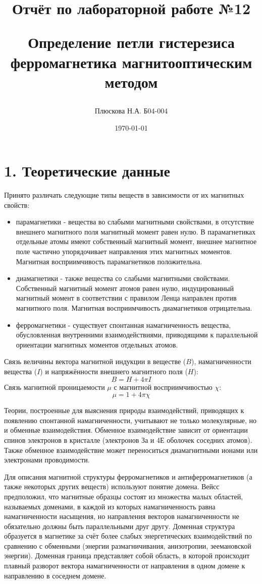 \documentclass[a4paper,12pt]{report}
\title{Отчёт по лабораторной работе №12

Определение петли гистерезиса
ферромагнетика магнитооптическим методом}
\author{Плюскова Н.А. Б04-004 }
\date{\today}
\begin{document}
\maketitle


\section*{1. Теоретические данные}
 Принято различать следующие типы веществ в зависимости от их магнитных свойств:
\begin{itemize}
    \item парамагнетики - вещества во слабыми магнитными свойствами, в отсутствие внешнего магнитного поля магнитный момент равен нулю. В парамагнетиках отдельные атомы имеют собственный магнитный момент, внешнее магнитное поле частично упорядочивает направления этих магнитных моментов. Магнитная восприимчивость парамагнетиков положительна.
    \item диамагнетики - также вещества со слабыми магнитными свойствами. Собственный магнитный момент атомов равен нулю, индуцированный магнитный момент в соответствии с правилом Ленца направлен против магнитного поля. Магнитная восприимчивость диамагнетиков отрицательна.
    \item ферромагнетики - существует спонтанная намагниченность вещества, обусловленная внутренними взаимодействиями, приводящими к параллельной ориентации магнитных моментов отдельных атомов.
\end{itemize}

Связь величины вектора магнитной индукции в веществе ($B$), намагниченности вещества ($I$) и напряжённости внешнего магнитного поля ($H$):
\begin{equation}
    B = H + 4\pi I
\end{equation}
Связь магнитной проницаемости $\mu$ с магнитной восприимчивостью $\chi$:
\begin{equation}
    \mu = 1 + 4\pi \chi
\end{equation}

Теории, построенные для выяснения природы взаимодействий, приводящих к появлению спонтанной намагниченности, учитывают не только молекулярные, но и обменные взаимодействия. Обменное взаимодействие зависит от ориентации спинов электронов в кристалле (электронов За и 4Е оболочек соседних атомов). Также обменное взаимодействие может переноситься диамагнитными ионами или электронами проводимости.

Для описания магнитной структуры ферромагнетиков и антиферромагнетиков (а также некоторых других веществ) используют понятие домена. Вейсс предположил, что магнитные образцы состоят из множества малых областей, называемых доменами, в каждой из которых намагниченность равна намагниченности насыщения, но направления векторов намагниченности не обязательно должны быть параллельными друг другу. Доменная структура образуется в магнетике за счёт более слабых энергетических взаимодействий по сравнению с обменными (энергии размагничивания, анизотропии, зеемановской энергии). Доменная граница представляет собой область, в которой происходит плавный разворот вектора намагниченности от направления в одном домене к направлению в соседнем домене.
\end{document}
